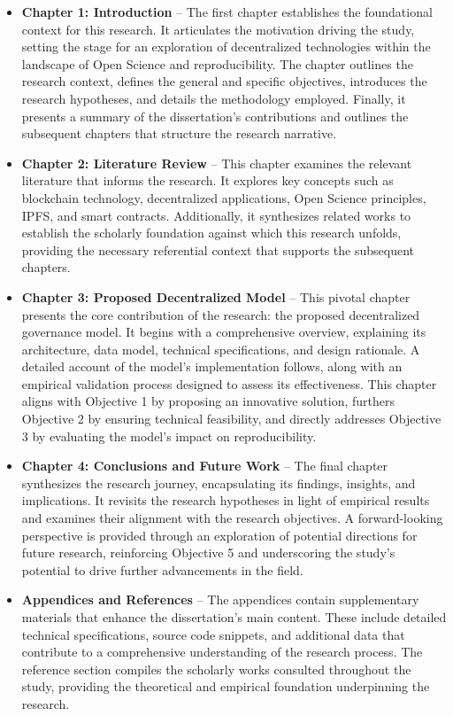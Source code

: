 \documentclass[final]{rc-book-2.14}
\begin{document}
\begin{itemize}
    \item  \textbf{Chapter 1: Introduction} – The first chapter establishes the foundational context for this research. It articulates the motivation driving the study, setting the stage for an exploration of decentralized technologies within the landscape of Open Science and reproducibility. The chapter outlines the research context, defines the general and specific objectives, introduces the research hypotheses, and details the methodology employed. Finally, it presents a summary of the dissertation’s contributions and outlines the subsequent chapters that structure the research narrative.

    \item \textbf{Chapter 2: Literature Review} – This chapter examines the relevant literature that informs the research. It explores key concepts such as blockchain technology, decentralized applications, Open Science principles, IPFS, and smart contracts. Additionally, it synthesizes related works to establish the scholarly foundation against which this research unfolds, providing the necessary referential context that supports the subsequent chapters.

    \item \textbf{Chapter 3: Proposed Decentralized Model} – This pivotal chapter presents the core contribution of the research: the proposed decentralized governance model. It begins with a comprehensive overview, explaining its architecture, data model, technical specifications, and design rationale. A detailed account of the model’s implementation follows, along with an empirical validation process designed to assess its effectiveness. This chapter aligns with Objective 1 by proposing an innovative solution, furthers Objective 2 by ensuring technical feasibility, and directly addresses Objective 3 by evaluating the model’s impact on reproducibility.

    \item \textbf{Chapter 4: Conclusions and Future Work} – The final chapter synthesizes the research journey, encapsulating its findings, insights, and implications. It revisits the research hypotheses in light of empirical results and examines their alignment with the research objectives. A forward-looking perspective is provided through an exploration of potential directions for future research, reinforcing Objective 5 and underscoring the study’s potential to drive further advancements in the field.

    \item \textbf{Appendices and References} – The appendices contain supplementary materials that enhance the dissertation’s main content. These include detailed technical specifications, source code snippets, and additional data that contribute to a comprehensive understanding of the research process. The reference section compiles the scholarly works consulted throughout the study, providing the theoretical and empirical foundation underpinning the research.


\end{itemize}
\end{document}
